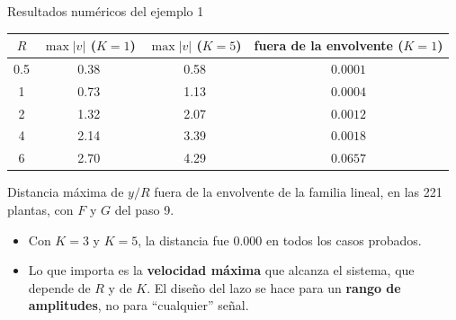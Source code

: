 \documentclass[aspectratio=169,11pt]{beamer}
\begin{document}
\begin{frame}{Resultados numéricos del ejemplo 1}
  \small
  \begin{center}
  \begin{tabular}{c|c|c|c}
    $R$ & $\max|v|$ ($K=1$) & $\max|v|$ ($K=5$) & fuera de la envolvente ($K=1$)\\\hline
    0.5 & 0.38 & 0.58 & $0.0001$\\
    1 & 0.73 & 1.13 & $0.0004$\\
    2 & 1.32 & 2.07 & $0.0012$\\
    4 & 2.14 & 3.39 & $0.0018$\\
    6 & 2.70 & 4.29 & $0.0657$
  \end{tabular}
  \end{center}
  \footnotesize
  Distancia máxima de $y/R$ fuera de la envolvente de la familia lineal, en las 221 plantas, con $F$ y $G$ del paso 9.
  \begin{itemize}
    \item Con $K=3$ y $K=5$, la distancia fue $0.000$ en todos los casos probados.
    \item Lo que importa es la \textbf{velocidad máxima} que alcanza el sistema, que depende de $R$ y de $K$. El diseño del lazo se hace para un \textbf{rango de amplitudes}, no para ``cualquier'' señal.
  \end{itemize}
\end{frame}
\end{document}
